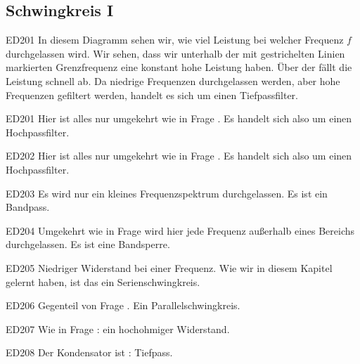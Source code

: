 \subsection{Schwingkreis I}


\begin{sol}{ED201}
In diesem Diagramm sehen wir, wie viel Leistung bei welcher Frequenz $f$ durchgelassen wird.
Wir sehen, dass wir unterhalb der mit gestrichelten Linien markierten Grenzfrequenz eine konstant hohe Leistung haben.
Über der  fällt die Leistung schnell ab.
Da niedrige Frequenzen durchgelassen werden, aber hohe Frequenzen gefiltert werden, handelt es sich um einen Tiefpassfilter.
\end{sol}

\begin{sol}{ED201}
    Hier ist alles nur umgekehrt wie in Frage . Es handelt sich also um einen Hochpassfilter.
\end{sol}

\begin{sol}{ED202}
    Hier ist alles nur umgekehrt wie in Frage . Es handelt sich also um einen Hochpassfilter.
\end{sol}


\begin{sol}{ED203}
 Es wird nur ein kleines Frequenzspektrum durchgelassen. Es ist ein Bandpass.
\end{sol}


\begin{sol}{ED204}
 Umgekehrt wie in Frage  wird hier jede Frequenz außerhalb eines Bereichs durchgelassen. 
 Es ist eine Bandsperre.
\end{sol}


\begin{sol}{ED205}
 Niedriger Widerstand bei einer Frequenz. Wie wir in diesem Kapitel gelernt haben, ist das ein Serienschwingkreis.
\end{sol}

\begin{sol}{ED206}
Gegenteil von Frage . Ein Parallelschwingkreis.
\end{sol}


\begin{sol}{ED207}
 Wie in Frage : ein hochohmiger Widerstand.
\end{sol}

\begin{sol}{ED208}
 Der Kondensator ist : Tiefpass.
\end{sol}

